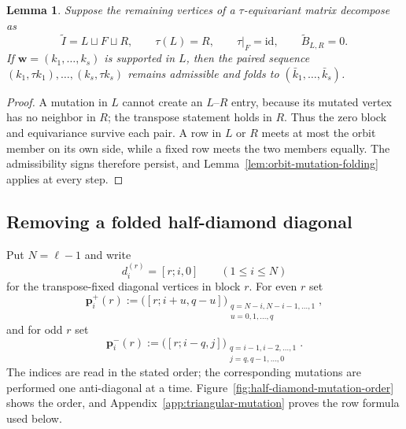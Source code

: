 \documentclass[11pt]{amsart}
\newtheorem{lemma}[theorem]{Lemma}
\theoremstyle{definition}
\theoremstyle{remark}
\begin{document}
\begin{lemma}\label{lem:separated-pair}
Suppose the remaining vertices of a $\tau$-equivariant matrix decompose as
\[ \widetilde I=L\sqcup F\sqcup R, \qquad \tau(L)=R, \qquad \tau|_F=\mathrm{id}, \qquad \widetilde B_{L,R}=0. \]
If $\mathbf w=(k_1,\ldots,k_s)$ is supported in $L$, then the paired sequence
$(k_1,\tau k_1),\ldots,(k_s,\tau k_s)$
remains admissible and folds to $(\bar k_1,\ldots,\bar k_s)$.
\end{lemma}

\begin{proof}
A mutation in $L$ cannot create an $L$--$R$ entry, because its mutated
vertex has no neighbor in $R$; the transpose statement holds in $R$.
Thus the zero block and equivariance survive each pair.  A row in $L$ or
$R$ meets at most the orbit member on its own side, while a fixed row meets
the two members equally.  The admissibility signs therefore persist, and
Lemma~\ref{lem:orbit-mutation-folding} applies at every step.
\end{proof}

\subsection{Removing a folded half-diamond diagonal}

Put $N=\ell-1$ and write
\[ d_i^{(r)}=[r;i,0] \qquad(1\le i\le N) \]
for the transpose-fixed diagonal vertices in block $r$.  For even $r$
set
\begin{equation}
 \mathbf p_i^+(r)
 :=\bigl([r;i+u,q-u]\bigr)_{
 {\substack{q=N-i,N-i-1,\ldots,1\\u=0,1,\ldots,q}}},
 \label{eq:positive-removal-sequence}
\end{equation}
and for odd $r$ set
\[ \mathbf p_i^-(r) :=\bigl([r;i-q,j]\bigr)_{ {\substack{q=i-1,i-2,\ldots,1\\j=q,q-1,\ldots,0}}}. \]
The indices are read in the stated order; the corresponding mutations are
performed one anti-diagonal at a time.  Figure~\ref{fig:half-diamond-mutation-order}
shows the order, and Appendix~\ref{app:triangular-mutation} proves the row
formula used below.
\end{document}
